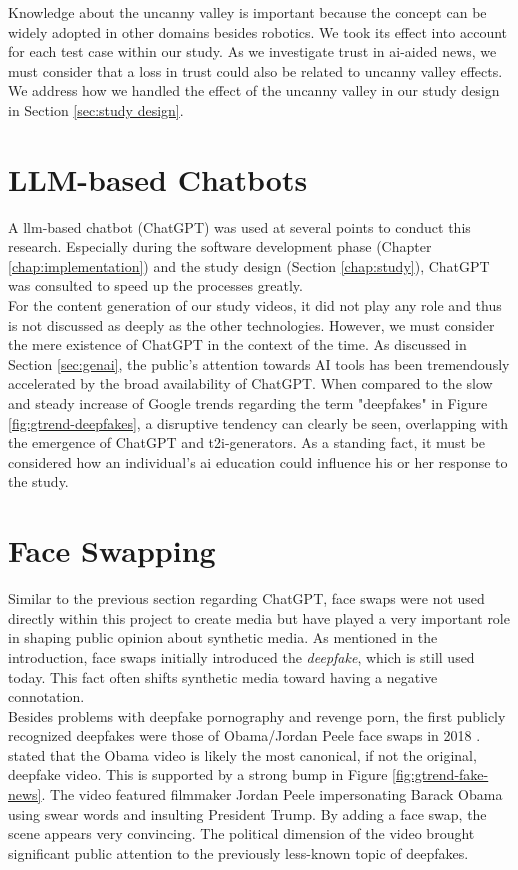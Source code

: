 \documentclass[
  a4paper,  %
  twoside,  %
  bibliography=totoc,
  headsepline,
  cleardoublepage=empty,
  parskip=half,
  draft=false
]{scrbook}
\begin{document}
Knowledge about the uncanny valley is important because the concept can be widely adopted in other domains besides robotics. We took its effect into account for each test case within our study. As we investigate trust in \gls{ai}-aided news, we must consider that a loss in trust could also be related to uncanny valley effects. We address how we handled the effect of the uncanny valley in our study design in Section \ref{sec:study design}.

\section{LLM-based Chatbots}
A \gls{llm}-based chatbot (ChatGPT) was used at several points to conduct this research. Especially during the software development phase (Chapter \ref{chap:implementation}) and the study design (Section \ref{chap:study}), ChatGPT was consulted to speed up the processes greatly. \\ 
For the content generation of our study videos, it did not play any role and thus is not discussed as deeply as the other technologies. However, we must consider the mere existence of ChatGPT in the context of the time. As discussed in Section \ref{sec:genai}, the public's attention towards AI tools has been tremendously accelerated by the broad availability of ChatGPT. When compared to the slow and steady increase of Google trends regarding the term "deepfakes" in Figure \ref{fig:gtrend-deepfakes}, a disruptive tendency can clearly be seen, overlapping with the emergence of ChatGPT and \gls{t2i}-generators. As a standing fact, it must be considered how an individual's \gls{ai} education could influence his or her response to the study.

\section{Face Swapping}
\label{sec:face-swapping}
Similar to the previous section regarding ChatGPT, face swaps were not used directly within this project to create media but have played a very important role in shaping public opinion about synthetic media. As mentioned in the introduction, face swaps initially introduced the \textit{deepfake}, which is still used today. This fact often shifts synthetic media toward having a negative connotation. \\
Besides problems with deepfake pornography and revenge porn, the first publicly recognized deepfakes were those of Obama/Jordan Peele face swaps in 2018 \cite{vincentWatchJordanPeele2018}. \citet{hancockSocialImpactDeepfakes2021} stated that the Obama video is likely the most canonical, if not the original, deepfake video. This is supported by a strong bump in Figure \ref{fig:gtrend-fake-news}. The video featured filmmaker Jordan Peele impersonating Barack Obama using swear words and insulting President Trump. By adding a face swap, the scene appears very convincing. The political dimension of the video brought significant public attention to the previously less-known topic of deepfakes.
\end{document}
